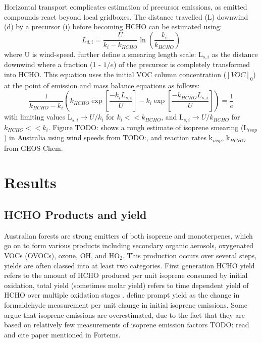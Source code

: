       Horizontal transport complicates estimation of precursor emissions, as emitted compounds react beyond local gridboxes.
      The distance travelled (L) downwind (d) by a precursor (i) before becoming HCHO can be estimated using:
      \begin{equation*}
        L_{d,i} = \frac{U}{k_i - k_{HCHO}} \ln{ \left( \frac{k_i}{k_{HCHO}} \right) }
      \end{equation*}
      where U is wind-speed.
      \textcite{Palmer2003} further define a smearing length scale: L$_{s,i}$ as the distance downwind where a fraction (1 - $1/e$) of the precursor is completely transformed into HCHO.
      This equation uses the initial VOC column concentration ($[VOC]_0$) at the point of emission and mass balance equations as follows:
      \begin{equation}
      \frac{1}{k_{HCHO}-k_i} \left( k_{HCHO} \exp{ \left[ \frac{-k_i L_{s,i}}{U} \right]} -k_i \exp{ \left[ \frac{-k_{HCHO} L_{s,i}}{U} \right]} \right) = \frac{1}{e} 
      \end{equation}
      with limiting values L$_{s,i} \rightarrow U/k_i$ for $k_i << k_{HCHO}$, and L$_{s,i} \rightarrow U/k_{HCHO}$ for $k_{HCHO} << k_i$.
      Figure TODO: shows a rough estimate of isoprene smearing (L$_{isop}$) in Australia using wind speeds from TODO:, and reaction rates k$_{isop}$, k$_{HCHO}$ from GEOS-Chem.
    
\section{Results}
  \label{BioIsop:Results}
  
  
  
    \subsection{HCHO Products and yield}
    \label{BioIsop:Results:HCHOYield}
    Australian forests are strong emitters of both isoprene and monoterpenes, which go on to form various products including secondary organic aerosols, oxygenated VOCs (OVOCs), ozone, OH, and HO$_2$.
    This production occurs over several steps, yields are often classed into at least two categories.
    First generation HCHO yield refers to the amount of HCHO produced per unit isoprene consumed by initial oxidation, total yield (sometimes molar yield) refers to time dependent yield of HCHO over multiple oxidation stages \parencite{Wolfe2016}.
    \textcite{Wolfe2016} define prompt yield as the change in formaldehyde measurement per unit change in initial isoprene emissions.
    Some argue that isoprene emissions are overestimated, due to the fact that they are based on relatively few measurements of isoprene emission factors \parencite{Winters2009, FortemsCheiney2012} TODO: read and cite paper mentioned in Fortems.
    
